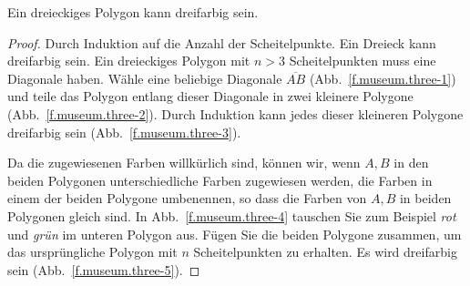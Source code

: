 \begin{theorem}
Ein dreieckiges Polygon kann dreifarbig sein.\label{thm.colored}
\end{theorem}

\begin{proof}
Durch Induktion auf die Anzahl der Scheitelpunkte. Ein Dreieck kann dreifarbig sein. Ein dreieckiges Polygon mit $n>3$ Scheitelpunkten muss eine Diagonale haben. Wähle eine beliebige Diagonale $\overline{AB}$ (Abb.~\ref{f.museum.three-1}) und teile das Polygon entlang dieser Diagonale in zwei kleinere Polygone (Abb.~\ref{f.museum.three-2}). Durch Induktion kann jedes dieser kleineren Polygone dreifarbig sein (Abb.~\ref{f.museum.three-3}).

Da die zugewiesenen Farben willkürlich sind, können wir, wenn $A,B$ in den beiden Polygonen unterschiedliche Farben zugewiesen werden, die Farben in einem der beiden Polygone umbenennen, so dass die Farben von $A,B$ in beiden Polygonen gleich sind. In Abb.~\ref{f.museum.three-4} tauschen Sie zum Beispiel \emph{rot} und \emph{grün} im unteren Polygon aus.
Fügen Sie die beiden Polygone zusammen, um das ursprüngliche Polygon mit $n$ Scheitelpunkten zu erhalten. Es wird dreifarbig sein (Abb.~\ref{f.museum.three-5}).
\end{proof}

